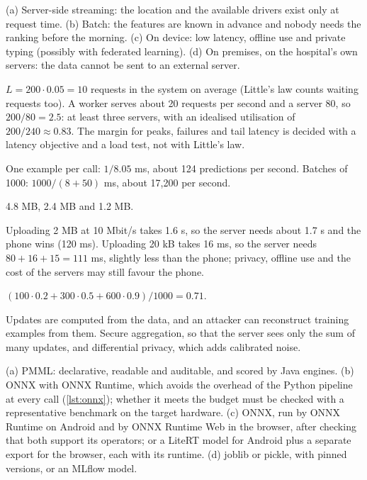 \begin{description}[font=\bfseries,leftmargin=0pt,itemsep=5pt]
  \item[\ref{exr5:choose}] (a) Server-side streaming: the location and the available drivers exist only at request
        time. (b) Batch: the features are known in advance and nobody needs the ranking before the morning.
        (c) On device: low latency, offline use and private typing (possibly with federated learning).
        (d) On premises, on the hospital's own servers: the data cannot be sent to an external server.
  \item[\ref{exr5:little}] $L=200\cdot0.05=10$ requests in the system on average (Little's law counts waiting requests
        too). A worker serves about 20 requests per second and a server 80, so $200/80=2.5$: at least three
        servers, with an idealised utilisation of $200/240\approx0.83$. The margin for peaks, failures and tail
        latency is decided with a latency objective and a load test, not with Little's law.

  \item[\ref{exr5:batch}] One example per call: $1/8.05$ ms, about 124 predictions per second. Batches of 1000:
        $1000/(8+50)$ ms, about 17,200 per second.
  \item[\ref{exr5:quant}] 4.8 MB, 2.4 MB and 1.2 MB.
  \item[\ref{exr5:latency}] Uploading 2 MB at 10 Mbit/s takes 1.6 s, so the server needs about 1.7 s and the phone
        wins (120 ms). Uploading 20 kB takes 16 ms, so the server needs $80+16+15=111$ ms, slightly less than the
        phone; privacy, offline use and the cost of the servers may still favour the phone.
  \item[\ref{exr5:fedavg}] $(100\cdot0.2+300\cdot0.5+600\cdot0.9)/1000=0.71$.
  \item[\ref{exr5:privacy}] Updates are computed from the data, and an attacker can reconstruct training examples
        from them. Secure aggregation, so that the server sees only the sum of many updates, and differential
        privacy, which adds calibrated noise.
  \item[\ref{exr5:format}] (a) PMML: declarative, readable and auditable, and scored by Java engines. (b) ONNX with
        ONNX Runtime, which avoids the overhead of the Python pipeline at every call (\cref{lst:onnx}); whether it
        meets the budget must be checked with a representative benchmark on the target hardware. (c) ONNX, run
        by ONNX Runtime on Android and by ONNX Runtime Web in the browser, after checking that both support its
        operators; or a LiteRT model for Android plus a separate export for the browser, each with its runtime.
        (d) joblib or pickle, with pinned versions, or an MLflow model.


\end{description}

